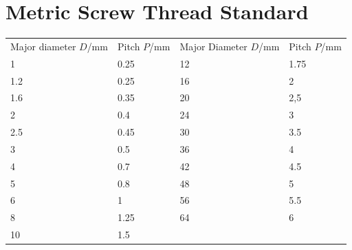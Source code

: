 \documentclass{article}
\begin{document}
\section{Metric Screw Thread Standard}

\begin{tabular}{@{}llll@{}}
 Major diameter $D$/mm & Pitch $P$/mm & Major Diameter $D$/mm & Pitch $P$/mm \\
 1 & 0.25 & 12 & 1.75 \\
 1.2 & 0.25 & 16 & 2 \\
 1.6 & 0.35 & 20 & 2,5\\
 2 & 0.4 & 24 & 3 \\
 2.5 & 0.45 & 30 & 3.5\\
 3 & 0.5 & 36 & 4\\
 4 & 0.7 & 42 & 4.5\\
 5 & 0.8 & 48 & 5 \\
 6 & 1 & 56 & 5.5 \\
 8 & 1.25 & 64 & 6 \\
 10 & 1.5
\end{tabular}
\end{document}
